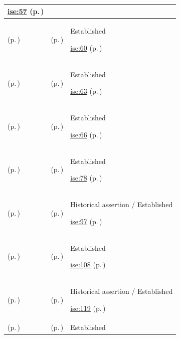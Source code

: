 \begin{longtable}{|>{\raggedright\arraybackslash}p{0.27\TableWidth}|>{\raggedright\arraybackslash}p{0.27\TableWidth}|>{\raggedright\arraybackslash}p{0.46\TableWidth}|}
 \hyperref[rad:ise:52]{ise:57} (p.\,\pageref{rad:ise:52})\\\hline
\nameref{function:mediate-information-retrieval} (p.\,\pageref{function:mediate-information-retrieval}) & \nameref{feature:feat-ise-05} (p.\,\pageref{feature:feat-ise-05}) & Established

 \hyperref[rad:ise:52]{ise:60} (p.\,\pageref{rad:ise:52})\\\hline
\nameref{function:distribute-addressed-information} (p.\,\pageref{function:distribute-addressed-information}) & \nameref{feature:feat-ise-06} (p.\,\pageref{feature:feat-ise-06}) & Established

 \hyperref[rad:ise:52]{ise:63} (p.\,\pageref{rad:ise:52})\\\hline
\nameref{function:syndicate-information-change} (p.\,\pageref{function:syndicate-information-change}) & \nameref{feature:feat-ise-07} (p.\,\pageref{feature:feat-ise-07}) & Established

 \hyperref[rad:ise:52]{ise:66} (p.\,\pageref{rad:ise:52})\\\hline
\nameref{function:search-health-information} (p.\,\pageref{function:search-health-information}) & \nameref{feature:feat-ise-08} (p.\,\pageref{feature:feat-ise-08}) & Established

 \hyperref[rad:ise:73]{ise:78} (p.\,\pageref{rad:ise:73})\\\hline
\nameref{function:mediate-standards-based-health-information-communication} (p.\,\pageref{function:mediate-standards-based-health-information-communication}) & \nameref{feature:feat-ise-10} (p.\,\pageref{feature:feat-ise-10}) & Historical assertion / Established

 \hyperref[rad:ise:92]{ise:97} (p.\,\pageref{rad:ise:92})\\\hline
\nameref{function:evaluate-information-access-authority} (p.\,\pageref{function:evaluate-information-access-authority}) & \nameref{feature:feat-ise-11} (p.\,\pageref{feature:feat-ise-11}) & Established

 \hyperref[rad:ise:104]{ise:108} (p.\,\pageref{rad:ise:104})\\\hline
\nameref{function:record-security-significant-activity} (p.\,\pageref{function:record-security-significant-activity}) & \nameref{feature:feat-ise-13} (p.\,\pageref{feature:feat-ise-13}) & Historical assertion / Established

 \hyperref[rad:ise:104]{ise:119} (p.\,\pageref{rad:ise:104})\\\hline
\nameref{function:resolve-clinical-concept} (p.\,\pageref{function:resolve-clinical-concept}) & \nameref{feature:feat-ise-14} (p.\,\pageref{feature:feat-ise-14}) & Established


\end{longtable}
